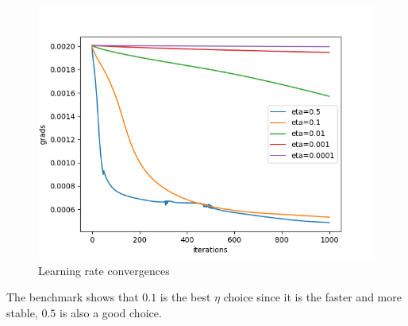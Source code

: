 \documentclass[11pt]{article}
\begin{document}
\begin{figure}[H]
\centering
\includegraphics[scale=0.6]{images/NN_boundary_vs_learning_rates/grads}
\caption{Learning rate convergences}
\label{fig: learning_rate_convergence}
\end{figure}

The benchmark shows that $0.1$ is the best $\eta$ choice since it is the faster and more stable, $0.5$ is also a good choice.
\end{document}
